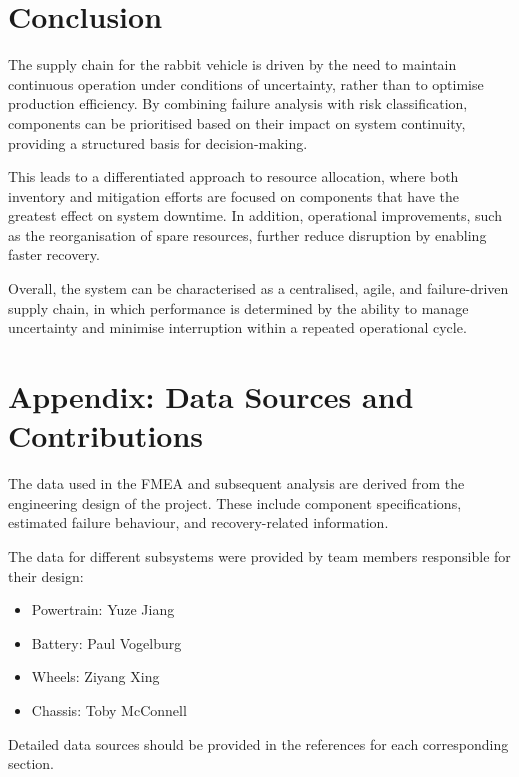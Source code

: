 \section{Conclusion}

The supply chain for the rabbit vehicle is driven by the need to maintain continuous operation under conditions of uncertainty, rather than to optimise production efficiency. By combining failure analysis with risk classification, components can be prioritised based on their impact on system continuity, providing a structured basis for decision-making.

This leads to a differentiated approach to resource allocation, where both inventory and mitigation efforts are focused on components that have the greatest effect on system downtime. In addition, operational improvements, such as the reorganisation of spare resources, further reduce disruption by enabling faster recovery.

Overall, the system can be characterised as a centralised, agile, and failure-driven supply chain, in which performance is determined by the ability to manage uncertainty and minimise interruption within a repeated operational cycle.

\section*{Appendix: Data Sources and Contributions}

The data used in the FMEA and subsequent analysis are derived from the engineering design of the project. These include component specifications, estimated failure behaviour, and recovery-related information.

The data for different subsystems were provided by team members responsible for their design:

\begin{itemize}
    \item Powertrain: Yuze Jiang
    \item Battery: Paul Vogelburg
    \item Wheels: Ziyang Xing
    \item Chassis: Toby McConnell
\end{itemize}

Detailed data sources should be provided in the references for each corresponding section.

\compactbib
